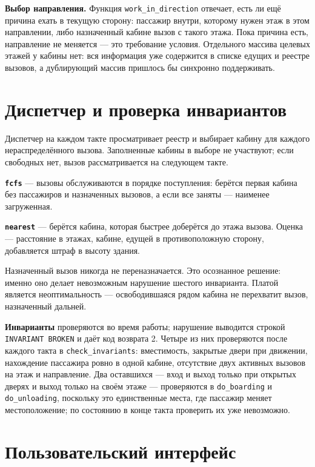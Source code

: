 \documentclass[12pt,a4paper]{article}
\begin{document}
\textbf{Выбор направления.} Функция \verb|work_in_direction| отвечает,
есть ли ещё причина ехать в текущую сторону: пассажир внутри, которому
нужен этаж в этом направлении, либо назначенный кабине вызов с такого
этажа. Пока причина есть, направление не меняется --- это требование
условия. Отдельного массива целевых этажей у кабины нет: вся информация
уже содержится в списке едущих и реестре вызовов, а дублирующий массив
пришлось бы синхронно поддерживать.

\section{Диспетчер и проверка инвариантов}

Диспетчер на каждом такте просматривает реестр и выбирает кабину для
каждого нераспределённого вызова. Заполненные кабины в выборе не
участвуют; если свободных нет, вызов рассматривается на следующем такте.

\textbf{\texttt{fcfs}} --- вызовы обслуживаются в порядке поступления:
берётся первая кабина без пассажиров и назначенных вызовов, а если все
заняты --- наименее загруженная.

\textbf{\texttt{nearest}} --- берётся кабина, которая быстрее доберётся до
этажа вызова. Оценка --- расстояние в этажах, кабине, едущей в
противоположную сторону, добавляется штраф в высоту здания.

Назначенный вызов никогда не переназначается. Это осознанное решение:
именно оно делает невозможным нарушение шестого инварианта. Платой
является неоптимальность --- освободившаяся рядом кабина не перехватит
вызов, назначенный дальней.

\textbf{Инварианты} проверяются во время работы; нарушение выводится
строкой \verb|INVARIANT BROKEN| и даёт код возврата 2. Четыре из них
проверяются после каждого такта в \verb|check_invariants|: вместимость,
закрытые двери при движении, нахождение пассажира ровно в одной кабине,
отсутствие двух активных вызовов на этаж и направление. Два оставшихся ---
вход и выход только при открытых дверях и выход только на своём этаже ---
проверяются в \verb|do_boarding| и \verb|do_unloading|, поскольку это
единственные места, где пассажир меняет местоположение; по состоянию в
конце такта проверить их уже невозможно.

\section{Пользовательский интерфейс}
\end{document}
